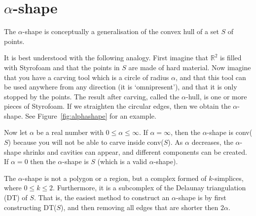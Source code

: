 %
\section{$\alpha$-shape}

The $\alpha$-shape is conceptually a generalisation of the convex hull of a set $S$ of points.

%

It is best understood with the following analogy.
First imagine that $\mathbb{R}^2$ is filled with Styrofoam and that the points in $S$ are made of hard material.
Now imagine that you have a carving tool which is a circle of radius $\alpha$, and that this tool can be used anywhere from any direction (it is `omnipresent'), and that it is only stopped by the points.
The result after carving, called the $\alpha$-hull, is one or more pieces of Styrofoam.
If we straighten the circular edges, then we obtain the $\alpha$-shape.
See Figure~\ref{fig:alphashape} for an example.

%

Now let $\alpha$ be a real number with $0 \leq \alpha \leq \infty$.
If $\alpha = \infty$, then the $\alpha$-shape is conv($S$) because you will not be able to carve inside conv($S$).
As $\alpha$ decreases, the $\alpha$-shape shrinks and cavities can appear, and different components can be created.
If $\alpha = 0$ then the $\alpha$-shape is $S$ (which is a valid $\alpha$-shape).

%

The $\alpha$-shape is not a polygon or a region, but a complex formed of $k$-simplices, where $0 \leq k \leq 2$.
Furthermore, it is a subcomplex of the Delaunay triangulation (DT) of $S$.
That is, the easiest method to construct an $\alpha$-shape is by first constructing DT($S$), and then removing all edges that are shorter then $2\alpha$.

